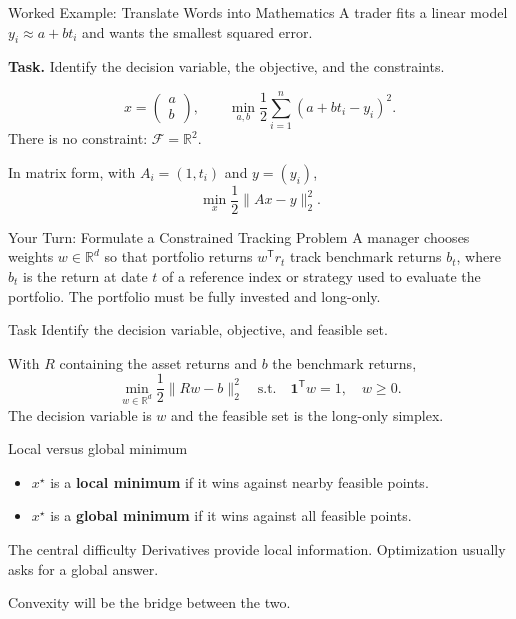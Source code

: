 \documentclass[aspectratio=169,11pt]{beamer}
\newcommand{\R}{\mathbb{R}}
\newcommand{\trans}{^{\mathsf T}}
\begin{document}
\begin{frame}{Worked Example: Translate Words into Mathematics}
  A trader fits a linear model $y_i\approx a+bt_i$ and wants the smallest squared error.

  \medskip
  \textbf{Task.} Identify the decision variable, the objective, and the constraints.

  \pause
  \[
    x=\begin{pmatrix}a\\b\end{pmatrix},
    \qquad
    \min_{a,b}\frac12\sum_{i=1}^n(a+bt_i-y_i)^2.
  \]
  There is no constraint: $\mathcal F=\R^2$.

  \pause
  In matrix form, with $A_i=(1,t_i)$ and $y=(y_i)$,
  \[
    \min_x \frac12\|Ax-y\|_2^2.
  \]
\end{frame}

\begin{frame}{Your Turn: Formulate a Constrained Tracking Problem}
  A manager chooses weights $w\in\R^d$ so that portfolio returns
  $w\trans r_t$ track benchmark returns $b_t$, where $b_t$ is the return at
  date $t$ of a reference index or strategy used to evaluate the portfolio.
  The portfolio must be fully invested and long-only.

  \begin{exampleblock}{Task}
    Identify the decision variable, objective, and feasible set.
  \end{exampleblock}

  \pause
  With $R$ containing the asset returns and $b$ the benchmark returns,
  \[
    \boxed{
    \min_{w\in\R^d}\frac12\|Rw-b\|_2^2
    \quad\text{s.t.}\quad \mathbf1\trans w=1,\quad w\geq0.}
  \]
  The decision variable is $w$ and the feasible set is the long-only simplex.
\end{frame}

\begin{frame}{Local versus global minimum}
  \begin{itemize}
    \item $x^\star$ is a \textbf{local minimum} if it wins against nearby feasible points.
    \item $x^\star$ is a \textbf{global minimum} if it wins against all feasible points.
  \end{itemize}

  \begin{alertblock}{The central difficulty}
    Derivatives provide local information. Optimization usually asks for a global answer.
  \end{alertblock}

  Convexity will be the bridge between the two.
\end{frame}
\end{document}
